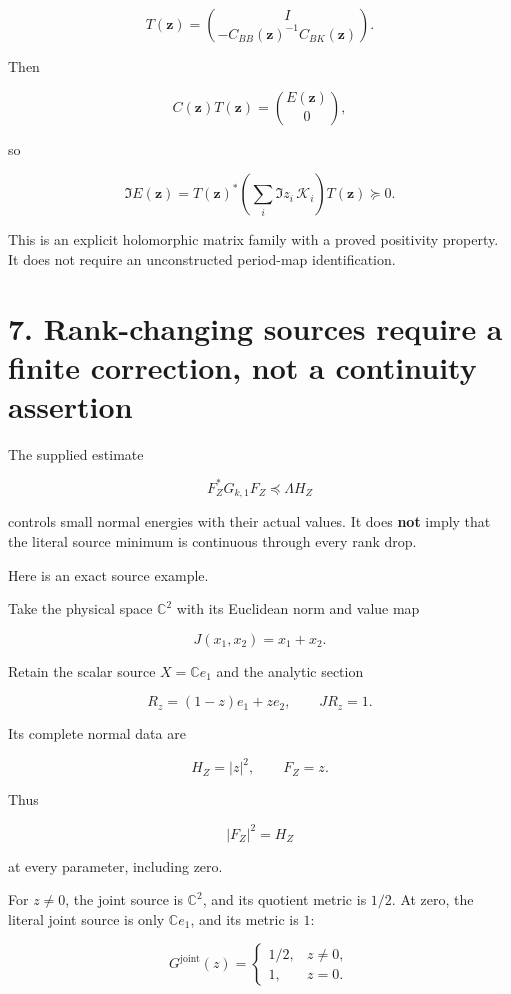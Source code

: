 \documentclass[11pt]{article}
\begin{document}
\[
T(\mathbf z)=
\binom{I}{-C_{BB}(\mathbf z)^{-1}C_{BK}(\mathbf z)}.
\]

Then

\[
C(\mathbf z)T(\mathbf z)=\binom{E(\mathbf z)}0,
\]

so

\[
\boxed{
\Im E(\mathbf z)
=
T(\mathbf z)^*
\left(\sum_i\Im z_i\,\mathcal K_i\right)
T(\mathbf z)\succeq0.
}
\tag{42}
\]

This is an explicit holomorphic matrix family with a proved positivity property. It does not require an unconstructed period-map identification.

\section{7. Rank-changing sources require a finite correction, not a continuity assertion}\label{rank-changing-sources-require-a-finite-correction-not-a-continuity-assertion}

The supplied estimate

\[
F_Z^*G_{k,1}F_Z\preceq\Lambda H_Z
\]

controls small normal energies with their actual values. It does \textbf{not} imply that the literal source minimum is continuous through every rank drop.

Here is an exact source example.

Take the physical space \(\mathbb C^2\) with its Euclidean norm and value map

\[
J(x_1,x_2)=x_1+x_2.
\]

Retain the scalar source \(X=\mathbb Ce_1\) and the analytic section

\[
R_z=(1-z)e_1+ze_2,
\qquad JR_z=1.
\]

Its complete normal data are

\[
H_Z=|z|^2,\qquad F_Z=z.
\]

Thus

\[
|F_Z|^2=H_Z
\]

at every parameter, including zero.

For \(z\ne0\), the joint source is \(\mathbb C^2\), and its quotient metric is \(1/2\). At zero, the literal joint source is only \(\mathbb Ce_1\), and its metric is \(1\):

\[
\boxed{
G^{\mathrm{joint}}(z)=
\begin{cases}
1/2,&z\ne0,\\
1,&z=0.
\end{cases}}
\tag{43}
\]
\end{document}
